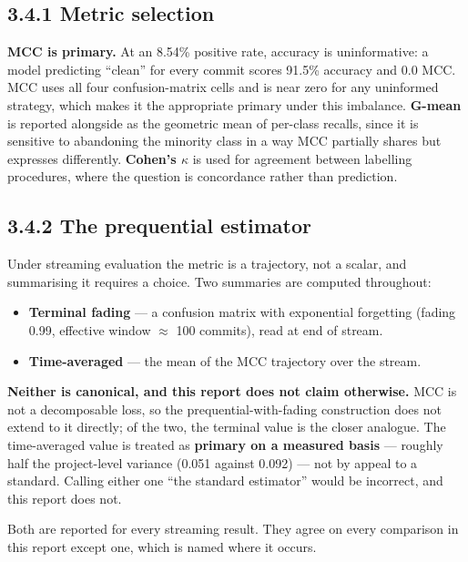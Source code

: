 \subsection{3.4.1 Metric selection}\label{metric-selection}

\textbf{MCC is primary.} At an 8.54\% positive rate, accuracy is
uninformative: a model predicting ``clean'' for every commit scores
91.5\% accuracy and 0.0 MCC. MCC uses all four confusion-matrix cells
and is near zero for any uninformed strategy, which makes it the
appropriate primary under this imbalance. \textbf{G-mean} is reported
alongside as the geometric mean of per-class recalls, since it is
sensitive to abandoning the minority class in a way MCC partially shares
but expresses differently. \textbf{Cohen's \ensuremath{\kappa}} is used for agreement
between labelling procedures, where the question is concordance rather
than prediction.

\subsection{3.4.2 The prequential
estimator}\label{the-prequential-estimator}

Under streaming evaluation the metric is a trajectory, not a scalar, and
summarising it requires a choice. Two summaries are computed throughout:

\begin{itemize}
\tightlist
\item
  \textbf{Terminal fading} --- a confusion matrix with exponential
  forgetting (fading 0.99, effective window \ensuremath{\approx} 100 commits), read at end
  of stream.
\item
  \textbf{Time-averaged} --- the mean of the MCC trajectory over the
  stream.
\end{itemize}

\textbf{Neither is canonical, and this report does not claim otherwise.}
MCC is not a decomposable loss, so the prequential-with-fading
construction does not extend to it directly; of the two, the terminal
value is the closer analogue. The time-averaged value is treated as
\textbf{primary on a measured basis} --- roughly half the project-level
variance (0.051 against 0.092) --- not by appeal to a standard. Calling
either one ``the standard estimator'' would be incorrect, and this
report does not.

Both are reported for every streaming result. They agree on every
comparison in this report except one, which is named where it occurs.


